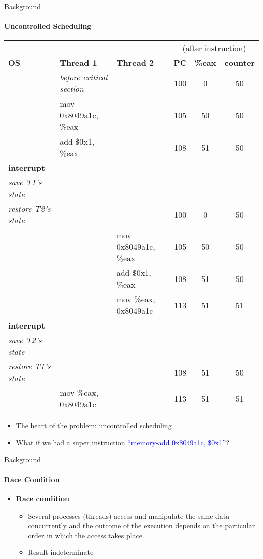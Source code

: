 \documentclass[10pt]{beamer}
\begin{document}
\begin{frame}{Background}
\framesubtitle{Uncontrolled Scheduling}
\centering
\scriptsize
\begin{tabular}{l l l c c c}
&&&\multicolumn{3}{c}{(after instruction)}\\
\textbf{OS}&\textbf{Thread 1}&\textbf{Thread 2}&\textbf{PC}&\textbf{\%eax}&\textbf{counter}\\
\hline
&\emph{before critical section}&&100&0&50\\
&mov 0x8049a1c, \%eax&&105&50&50\\
&add \$0x1, \%eax&&108&51&50\\
\textbf{interrupt}&&&&&\\
\quad\emph{save T1's state}&&&&&\\
\quad\emph{restore T2's state}&&&100&0&50\\
&&mov 0x8049a1c, \%eax&105&50&50\\
&&add \$0x1, \%eax&108&51&50\\
&&mov \%eax, 0x8049a1c&113&51&51\\
\textbf{interrupt}&&&&&\\
\quad\emph{save T2's state}&&&&&\\
\quad\emph{restore T1's state}&&&108&51&50\\
&mov \%eax, 0x8049a1c&&113&51&51\\
\end{tabular}
\begin{itemize}
 
\item The heart of the problem: uncontrolled scheduling
\item What if we had a super instruction \textcolor{blue}{``memory-add 0x8049a1c, \$0x1''}?
\end{itemize}
\end{frame}

\begin{frame}{Background}
\framesubtitle{Race Condition}
\begin{itemize}
\item \textbf{\alert{Race condition}}
\begin{itemize}
\item Several processes (threads) access and manipulate the same data concurrently and the outcome of the execution depends on the particular order in which the access takes place.
\item \alert{Result indeterminate}
\end{itemize}
\end{itemize}
\end{frame}
\end{document}
